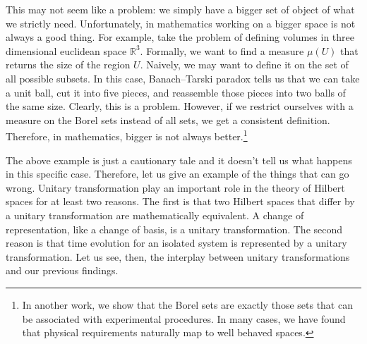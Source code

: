 \documentclass[10pt,twocolumn, nofootinbib]{revtex4-2}
\begin{document}
This may not seem like a problem: we simply have a bigger set of object of what we strictly need. Unfortunately, in mathematics working on a bigger space is not always a good thing. For example, take the problem of defining volumes in three dimensional euclidean space $\mathbb{R}^3$. Formally, we want to find a measure $\mu(U)$ that returns the size of the region $U$. Naively, we may want to define it on the set of all possible subsets. In this case, Banach–Tarski paradox tells us that we can take a unit ball, cut it into five pieces, and reassemble those pieces into two balls of the same size. Clearly, this is a problem. However, if we restrict ourselves with a measure on the Borel sets instead of all sets, we get a consistent definition. Therefore, in mathematics, bigger is not always better.\footnote{In another work, we show that the Borel sets are exactly those sets that can be associated with experimental procedures. In many cases, we have found that physical requirements naturally map to well behaved spaces.}

The above example is just a cautionary tale and it doesn't tell us what happens in this specific case. Therefore, let us give an example of the things that can go wrong. Unitary transformation play an important role in the theory of Hilbert spaces for at least two reasons. The first is that two Hilbert spaces that differ by a unitary transformation are mathematically equivalent. A change of representation, like a change of basis, is a unitary transformation. The second reason is that time evolution for an isolated system is represented by a unitary transformation. Let us see, then, the interplay between unitary transformations and our previous findings.
\end{document}
